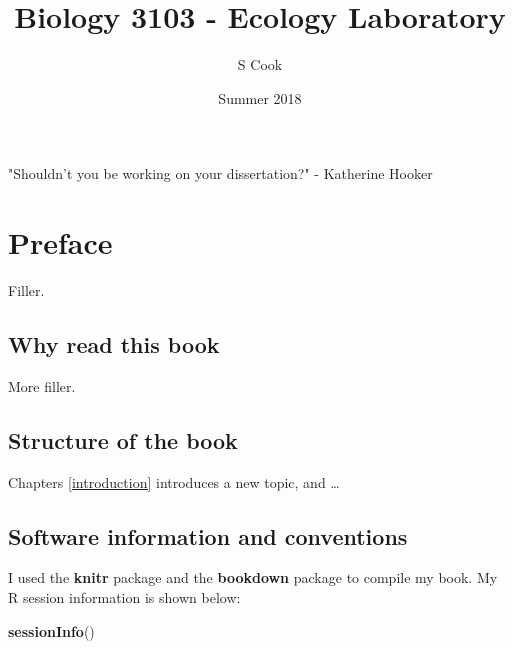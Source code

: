 \documentclass[]{book}
\title{Biology 3103 - Ecology Laboratory}
\author{S Cook}
\date{Summer 2018}
\makeatletter
\newenvironment{Shaded}{\begin{snugshade}}{\end{snugshade}}
\newcommand{\KeywordTok}[1]{\textcolor[rgb]{0.13,0.29,0.53}{\textbf{#1}}}
\newcommand{\NormalTok}[1]{#1}
\newenvironment{kframe}{%
\medskip{}
\setlength{\fboxsep}{.8em}
 \def\at@end@of@kframe{}%
 \ifinner\ifhmode%
  \def\at@end@of@kframe{\end{minipage}}%
  \begin{minipage}{\columnwidth}%
 \fi\fi%
 \def\FrameCommand##1{\hskip\@totalleftmargin \hskip-\fboxsep
 \colorbox{shadecolor}{##1}\hskip-\fboxsep
     \hskip-\linewidth \hskip-\@totalleftmargin \hskip\columnwidth}%
 \MakeFramed {\advance\hsize-\width
   \@totalleftmargin\z@ \linewidth\hsize
   \@setminipage}}%
 {\par\unskip\endMakeFramed%
 \at@end@of@kframe}
\renewenvironment{Shaded}{\begin{kframe}}{\end{kframe}}
\theoremstyle{definition}
\theoremstyle{definition}
\theoremstyle{definition}
\theoremstyle{remark}
\makeatother
\begin{document}
\maketitle


\thispagestyle{empty}

\begin{center}
"Shouldn't you be working on your dissertation?"
- Katherine Hooker
\end{center}

\setlength{\abovedisplayskip}{-5pt}
\setlength{\abovedisplayshortskip}{-5pt}

{
\hypersetup{linkcolor=black}
\setcounter{tocdepth}{2}
\tableofcontents
}
\listoftables
\listoffigures
\chapter*{Preface}\label{preface}


Filler.

\section*{Why read this book}\label{why-read-this-book}


More filler.

\section*{Structure of the book}\label{structure-of-the-book}


Chapters \ref{introduction} introduces a new topic, and \ldots{}

\section*{Software information and
conventions}\label{software-information-and-conventions}


I used the \textbf{knitr} package \citep{xie2015} and the
\textbf{bookdown} package \citep{R-bookdown} to compile
my book. My R session information is shown below:

\begin{Shaded}
\begin{Highlighting}[]
\KeywordTok{sessionInfo}\NormalTok{()}
\end{Highlighting}
\end{Shaded}
\end{document}
